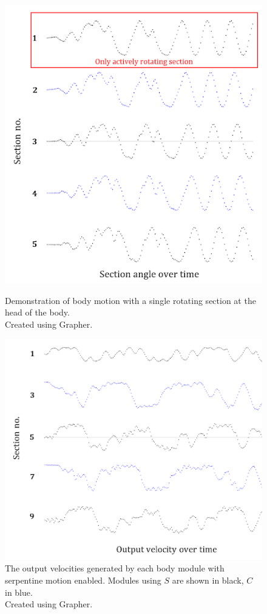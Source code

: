 \documentclass{article}
\begin{document}
\begin{figure}[H]
\begin{minipage}[t]{.4\textwidth}
\centering
\includegraphics[width=1\textwidth]{cpgMirroring}
\caption{Demonstration of body motion with a single rotating section at the head of the body. \\Created using Grapher. \citep{grapher}}
\label{fig:drivingOutput}
\end{minipage}
\hfill
\begin{minipage}[t]{.5\textwidth}
\centering
\includegraphics[width=1\textwidth]{cpgSerpentine}
\caption{The output velocities generated by each body module with serpentine motion enabled. Modules using $S$ are shown in black, $C$ in blue. \\Created using Grapher. \citep{grapher}}
\end{minipage}
\end{figure}
\end{document}
